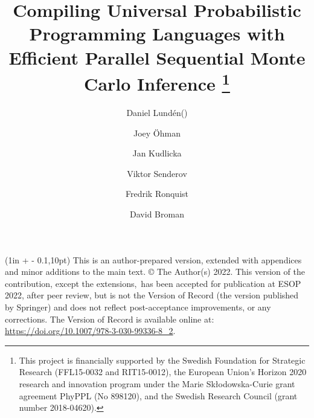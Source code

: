 \documentclass[runningheads]{llncs}
\def\orcidID#1{\smash{\href{http://orcid.org/#1}{\protect\raisebox{-1.25pt}{\protect\texttt{[image: orcid\_color.eps]}}}}}
\def\orcidID#1{}
\begin{document}
\title{%
  Compiling Universal Probabilistic Programming Languages with Efficient Parallel Sequential Monte Carlo Inference%
  \thanks{%
    This project is financially supported by the Swedish Foundation for Strategic Research (FFL15-0032 and RIT15-0012), the European Union's Horizon 2020 research and innovation program under the Marie Sk\l{}odowska-Curie grant agreement PhyPPL (No 898120), and the Swedish Research Council (grant number 2018-04620).
  }%
}

\author{%
  Daniel Lundén(\raisebox{-2.4pt}{\Envelope})\orcidID{0000-0003-3127-5640} \and%
  Joey Öhman\orcidID{0000-0001-6342-268X} \and%
  Jan Kudlicka\orcidID{0000-0003-3806-4950} \and%
  Viktor Senderov\orcidID{0000-0003-3340-5963} \and%
  Fredrik Ronquist\orcidID{0000-0002-3929-251X} \and%
  David Broman\orcidID{0000-0001-8457-4105} \\[2mm]
}

%


%
\maketitle              %

\ifauthor
\begin{textblock*}{1.2\textwidth}(1in + \oddsidemargin - 0.1\textwidth,10pt)
  \noindent
  \scriptsize
  This is an author-prepared version\ifextended, extended with appendices and minor additions to the main text\fi.
  © The Author(s) 2022.
  This version of the contribution\ifextended, except the extensions,\fi\ has been accepted for publication at ESOP 2022, after peer review, but is not the Version of Record (the version published by Springer) and does not reflect post-acceptance improvements, or any corrections.
  The Version of Record is available online at: \url{https://doi.org/10.1007/978-3-030-99336-8_2}.
\end{textblock*}
\fi
\end{document}
